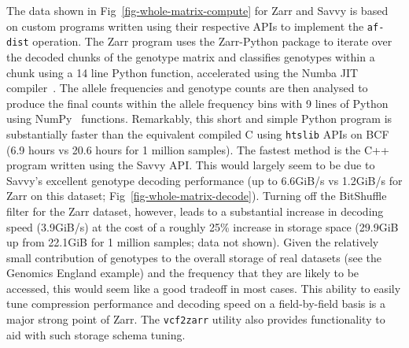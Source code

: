 \documentclass[a4paper,num-refs]{oup-contemporary}
\begin{document}
The data shown in Fig~\ref{fig-whole-matrix-compute} for Zarr and Savvy
is based on custom programs written using their respective APIs
to implement the \texttt{af-dist} operation. The Zarr program uses
the Zarr-Python package to iterate over the decoded chunks of the 
genotype matrix and classifies genotypes within a chunk using a 14 line Python
function, accelerated using the Numba JIT compiler~\cite{lam2015numba}.
The allele frequencies and genotype counts are then analysed to produce 
the final counts within the allele frequency bins with 9 lines of 
Python using NumPy~\cite{harris2020array} functions. Remarkably, this 
short and simple Python program is substantially faster than the 
equivalent compiled C using \texttt{htslib} APIs on BCF (6.9 hours
vs 20.6 hours for 1 million samples). 
The fastest method is the 
C++ program written using the Savvy API. This would largely seem
to be due to Savvy's excellent genotype decoding performance
(up to 6.6GiB/s vs 1.2GiB/s for Zarr on this dataset;
Fig~\ref{fig-whole-matrix-decode}).
Turning off the BitShuffle filter for the Zarr dataset,
however, leads to a substantial increase in decoding speed
(3.9GiB/s) at the cost of a roughly 25\% increase in storage
space (29.9GiB up from 22.1GiB for 1 million samples; data not
shown). Given the relatively small contribution of genotypes to the
overall storage of real datasets (see the Genomics England example)
and the frequency that they are likely to be accessed, this
would seem like a good tradeoff in most cases.
This ability to easily tune compression performance
and decoding speed on a field-by-field basis is a major strong
point of Zarr. The \texttt{vcf2zarr} utility also provides
functionality to aid with such storage schema tuning.
\end{document}

